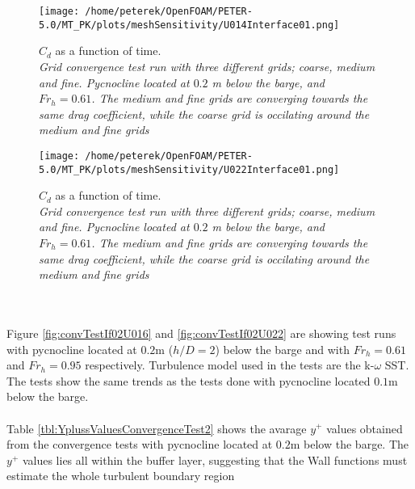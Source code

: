 \documentclass[a4paper, 12pt]{report}
\begin{document}
\begin{minipage}{.45\textwidth} 
	\begin{figure}[H]
		\centering
		\texttt{[image: /home/peterek/OpenFOAM/PETER-5.0/MT\_PK/plots/meshSensitivity/U014Interface01.png]}
		\caption{$C_d$ as a function of time. \\ \textit{Grid convergence test run with three different grids; coarse, medium and fine. Pycnocline located at $0.2$ m below the barge, and $Fr_h = 0.61$. The medium and fine grids are converging towards the same drag coefficient, while the coarse grid is occilating around the medium and fine grids}}
		\label{fig:convTestIf01U01}
	\end{figure}
\end{minipage}\hfill
\vspace{2ex}
\begin{minipage}{.45\textwidth} 
	\begin{figure}[H]
		\centering
		\texttt{[image: /home/peterek/OpenFOAM/PETER-5.0/MT\_PK/plots/meshSensitivity/U022Interface01.png]}
		\caption{$C_d$ as a function of time. \\ \textit{Grid convergence test run with three different grids; coarse, medium and fine. Pycnocline located at $0.2$ m below the barge, and $Fr_h = 0.61$. The medium and fine grids are converging towards the same drag coefficient, while the coarse grid is occilating around the medium and fine grids}}
		\label{fig:convTestIf01U022}
	\end{figure}
\end{minipage}\hfill
\vspace{2ex}\\
\\
Figure \ref{fig:convTestIf02U016} and \ref{fig:convTestIf02U022} are showing test runs with pycnocline located at $0.2$m ($h/D=2$) below the barge and with $Fr_h = 0.61$ and $Fr_h = 0.95$ respectively. Turbulence model used in the tests are the k-$\omega$ SST. The tests show the same trends as the tests done with pycnocline located $0.1$m below the barge.\\
\\
Table \ref{tbl:YplussValuesConvergenceTest2} shows the avarage $y^+$ values obtained from the convergence tests with pycnocline located at $0.2$m below the barge. The $y^+$ values lies all within the buffer layer, suggesting that the Wall functions must estimate the whole turbulent boundary region
\end{document}
